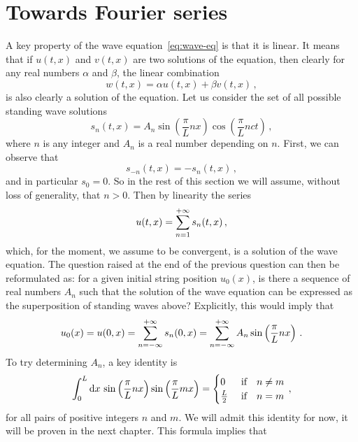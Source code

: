 \section{Towards Fourier series}
A key property of the wave equation~\cref{eq:wave-eq} is that it is linear. It means that if
$u(t,x)$ and $v(t,x)$ are two solutions of the equation, then clearly for any real numbers $\alpha$ and $\beta$, the linear combination
\begin{equation}
  w(t,x)=\alpha u(t,x)+\beta v(t,x)\,,
\end{equation}
is also clearly a solution of the equation. Let us consider the set of all possible standing wave solutions
\begin{equation}
  s_n(t,x)=A_n\sin\left(\frac{\pi}{L}nx\right)\cos\left(\frac{\pi}{L}nct\right)\,,
\end{equation}
where $n$ is any integer and $A_n$ is a real number depending on $n$. First, we can observe that
\begin{equation}
  s_{-n}(t,x)=-s_n(t,x)\,,
\end{equation}
and in particular $s_0=0$. So in the rest of this section we will assume, without loss of generality, that $n>0$. Then by linearity the series
\begin{equation}
  u(t,x)=\sum_{n=1}^{+\infty}s_n(t,x)\,,
\end{equation}
which, for the moment, we assume to be convergent, is a solution of the wave equation. The question raised at the end of the previous question can then be reformulated as: for a given initial string position $u_0(x)$, is there a sequence of real numbers $A_n$ such that the solution of the wave equation can be expressed as the superposition of standing waves above? Explicitly, this would imply that
\begin{equation}
  u_0(x)=u(0,x)=\sum_{n=-\infty}^{+\infty}s_n(0,x)=\sum_{n=-\infty}^{+\infty}A_n\sin\left(\frac{\pi}{L}nx\right)\,.
\end{equation}
To try determining $A_n$, a key identity is
\begin{equation}
  \int_{0}^{L}\mathrm{d} x\,\sin\left(\frac{\pi}{L}nx\right)\sin\left(\frac{\pi}{L}mx\right)
  =
  \begin{cases}
    0&~\text{if}\quad n\neq m\\
    \frac{L}{2}&~\text{if}\quad n=m
  \end{cases}
  \,,
\end{equation}
for all pairs of positive integers $n$ and $m$.
We will admit this identity for now, it will be proven in the next chapter. This formula implies that

